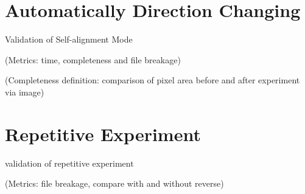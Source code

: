 \section{Automatically Direction Changing}
Validation of Self-alignment Mode
\par\noindent
(Metrics: time, completeness and file breakage)								
\par\noindent
(Completeness definition: comparison of pixel area before and after experiment via image)
\section{Repetitive Experiment}
validation of repetitive experiment
\par\noindent
(Metrics: file breakage, compare with and without reverse)
